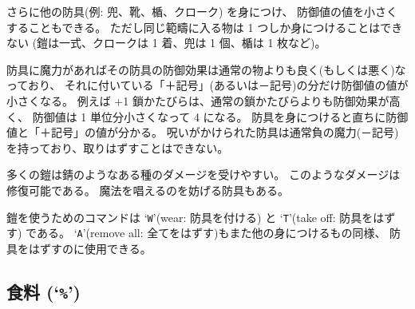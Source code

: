 \nd さらに他の防具(例: 兜、靴、楯、クローク) を身につけ、
防御値の値を小さくすることもできる。
ただし同じ範疇に入る物は 1 つしか身につけることはできない
(鎧は一式、クロークは 1 着、兜は 1 個、楯は 1 枚など)。

防具に魔力があればその防具の防御効果は通常の物よりも良く(もしくは悪く)なっており、
それに付いている「＋記号」(あるいは－記号)の分だけ防御値の値が小さくなる。
例えば +1 鎖かたびらは、通常の鎖かたびらよりも防御効果が高く、
防御値は 1 単位分小さくなって 4 になる。
防具を身につけると直ちに防御値と「＋記号」の値が分かる。
呪いがかけられた防具は通常負の魔力(－記号)を持っており、取りはずすことはできない。

多くの鎧は錆のようなある種のダメージを受けやすい。
このようなダメージは修復可能である。
魔法を唱えるのを妨げる防具もある。

鎧を使うためのコマンドは `{\tt W}'(wear: 防具を付ける) と 
`{\tt T}'(take off: 防具をはずす) である。 
`{\tt A}'(remove all: 全てをはずす)もまた他の身につけるもの同様、
防具をはずすのに使用できる。

\subsection*{食料 (`{\tt \%}')}

